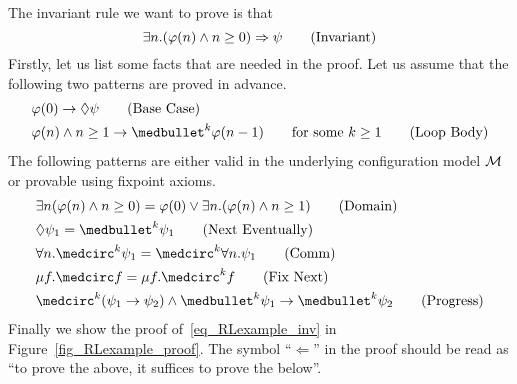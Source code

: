 \documentclass{amsart}
\begin{document}
The invariant rule we want to prove is that
\begin{equation}\label{eq_RLexample_inv}
\exists n . (\varphi(n) \wedge n \ge 0) \Rightarrow \psi \tag{Invariant}
\end{equation}
Firstly, let us list some facts that are needed in the proof.
Let us assume that the following two patterns are proved in advance.
\begin{align}
&\varphi(0) \imp \eventually \psi
\tag{Base Case}\label{eq_RLexample_base_case}
\\
&\varphi(n) \wedge n \ge 1 \imp \snext^k \varphi(n-1)
\qquad \text{for some $k \ge 1$}
\tag{Loop Body}\label{eq_RLexample_loop_body}
\end{align}
The following patterns are either valid in the underlying
configuration model $\mathcal{M}$ or provable using fixpoint axioms.
\begin{align}
&\exists n (\varphi(n) \wedge n \ge 0) 
 = \varphi(0) \vee \exists n . (\varphi(n) \wedge n \ge 1)
\tag{Domain}\label{eq_RLexample_domain}
\\
&\eventually \psi_1 = \snext^k \psi_1
\tag{Next Eventually}\label{eq_RLexample_next_eventually}
\\
&\forall n . \wnext^k \psi_1 = \wnext^k \forall n . \psi_1
\tag{Comm}\label{eq_RLexample_comm}
\\
&\mu f . \wnext f = \mu f . \wnext^k f
\tag{Fix Next}\label{eq_RLexample_fix_wnext}
\\
&\wnext^k(\psi_1 \imp \psi_2) \wedge \snext^k \psi_1 \imp \snext^k \psi_2
\tag{Progress}\label{eq_RLexample_progress}
\end{align}
Finally we show the proof of~\eqref{eq_RLexample_inv} in 
Figure~\ref{fig_RLexample_proof}.
The symbol ``$\Longleftarrow$'' in the proof should be read as
``to prove the above, it suffices to prove the below''.
\end{document}
